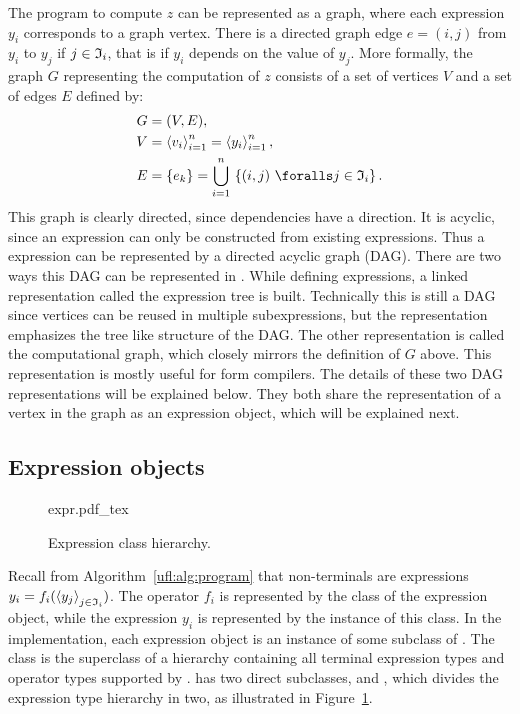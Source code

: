 The program to compute $z$ can be represented as a graph, where each
expression $y_i$ corresponds to a graph vertex. There is a directed
graph edge $e = (i, j)$ from $y_i$ to $y_j$ if $j \in \mathfrak{I}_i$, that is
if $y_i$ depends on the value of $y_j$. More formally, the graph $G$
representing the computation of $z$ consists of a set of vertices $V$
and a set of edges $E$ defined by:
\begin{align}
G &= (V, E), \label{ufl:eq:G} \\
V &= \seq{v_i}_{i=1}^n = \seq{y_i}_{i=1}^n, \label{ufl:eq:V} \\
E &= \{ e_k \} = \bigcup_{i=1}^n \, \left\{ (i, j) \,\, \foralls j \in \mI_i \right\} . \label{ufl:eq:E}
\end{align}
This graph is clearly directed, since dependencies have a direction.
It is acyclic, since an expression can only be constructed from
existing expressions.  Thus a \ufl{} expression can be represented by
a directed acyclic graph (DAG).  There are two ways this DAG can be
represented in \ufl{}. While defining expressions, a linked
representation called the expression tree is built. Technically this
is still a DAG since vertices can be reused in multiple
subexpressions, but the representation emphasizes the tree like
structure of the DAG. The other representation is called the
computational graph, which closely mirrors the definition of $G$
above. This representation is mostly useful for form compilers.  The
details of these two DAG representations will be explained below.
They both share the representation of a vertex in the graph as an
expression object, which will be explained next.

\subsection{Expression objects}

\begin{figure}[tb]
\def\svgwidth{\largefig}
{expr.pdf_tex}
\caption{Expression class hierarchy.}
\label{ufl:fig:expr}
\end{figure}

Recall from Algorithm~\ref{ufl:alg:program} that non-terminals are
expressions $y_i = f_i(\left<y_j\right>_{j\in\mathfrak{I}_i})$.  The operator
$f_i$ is represented by the class of the expression object, while the
expression $y_i$ is represented by the instance of this class.  In the
\ufl{} implementation, each expression object is an instance of some
subclass of . The class  is the superclass of
a hierarchy containing all terminal expression types and operator
types supported by \ufl{}.  has two direct subclasses,
 and , which divides the expression
type hierarchy in two, as illustrated in Figure~\ref{ufl:fig:expr}.

